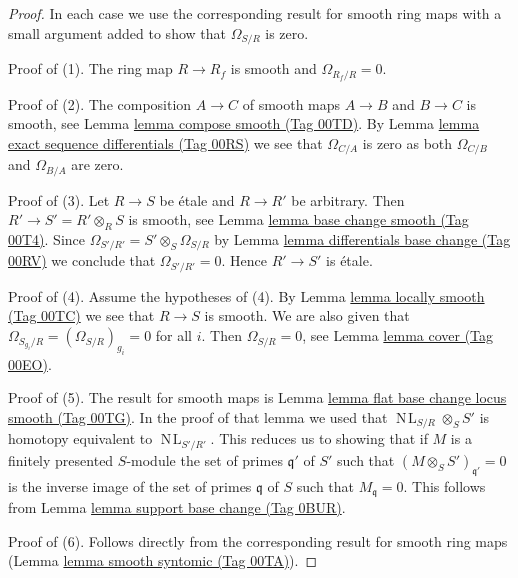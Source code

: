 \documentclass{amsart}
\theoremstyle{plain}
\theoremstyle{definition}
\theoremstyle{remark}
\numberwithin{equation}{subsection}
\def\NL{\mathop{N\!L}\nolimits}
\begin{document}
\begin{proof}
In each case we use the corresponding result for smooth ring maps with
a small argument added to show that $\Omega_{S/R}$ is zero.

\medskip\noindent
Proof of (1). The ring map $R \to R_f$ is smooth and $\Omega_{R_f/R} = 0$.

\medskip\noindent
Proof of (2). The composition $A \to C$ of smooth maps $A \to B$ and
$B \to C$ is smooth, see Lemma \href{https://stacks.math.columbia.edu/tag/00TD}{lemma compose smooth (Tag 00TD)}. By
Lemma \href{https://stacks.math.columbia.edu/tag/00RS}{lemma exact sequence differentials (Tag 00RS)} we see that
$\Omega_{C/A}$ is zero as both $\Omega_{C/B}$ and $\Omega_{B/A}$ are zero.

\medskip\noindent
Proof of (3). Let $R \to S$ be \'etale and $R \to R'$ be arbitrary.
Then $R' \to S' = R' \otimes_R S$ is smooth, see
Lemma \href{https://stacks.math.columbia.edu/tag/00T4}{lemma base change smooth (Tag 00T4)}. Since
$\Omega_{S'/R'} = S' \otimes_S \Omega_{S/R}$ by
Lemma \href{https://stacks.math.columbia.edu/tag/00RV}{lemma differentials base change (Tag 00RV)}
we conclude that $\Omega_{S'/R'} = 0$. Hence $R' \to S'$ is \'etale.

\medskip\noindent
Proof of (4). Assume the hypotheses of (4). By
Lemma \href{https://stacks.math.columbia.edu/tag/00TC}{lemma locally smooth (Tag 00TC)} we see that $R \to S$ is smooth.
We are also given that $\Omega_{S_{g_i}/R} = (\Omega_{S/R})_{g_i} = 0$
for all $i$. Then $\Omega_{S/R} = 0$, see Lemma \href{https://stacks.math.columbia.edu/tag/00EO}{lemma cover (Tag 00EO)}.

\medskip\noindent
Proof of (5). The result for smooth maps is
Lemma \href{https://stacks.math.columbia.edu/tag/00TG}{lemma flat base change locus smooth (Tag 00TG)}.
In the proof of that lemma we used that $\NL_{S/R} \otimes_S S'$
is homotopy equivalent to $\NL_{S'/R'}$.
This reduces us to showing that if $M$ is a finitely presented
$S$-module the set of primes $\mathfrak q'$ of $S'$
such that $(M \otimes_S S')_{\mathfrak q'} = 0$ is the inverse
image of the set of primes $\mathfrak q$ of $S$ such that
$M_{\mathfrak q} = 0$. This follows from Lemma \href{https://stacks.math.columbia.edu/tag/0BUR}{lemma support base change (Tag 0BUR)}.

\medskip\noindent
Proof of (6). Follows directly from the corresponding result for
smooth ring maps (Lemma \href{https://stacks.math.columbia.edu/tag/00TA}{lemma smooth syntomic (Tag 00TA)}).


\end{proof}
\end{document}
